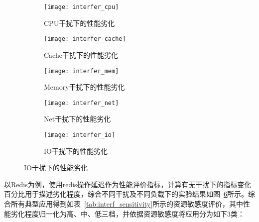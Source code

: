 \begin{figure}[H]
    \centering
    \begin{subfigure}[b]{0.32\textwidth}
        \texttt{[image: interfer\_cpu]}
        \caption{CPU干扰下的性能劣化}
        \label{fig:interfer_cpu}
    \end{subfigure}
    \begin{subfigure}[b]{0.32\textwidth}
      \texttt{[image: interfer\_cache]}
      \caption{Cache干扰下的性能劣化}
      \label{fig:interfer_cache}
    \end{subfigure}
    \begin{subfigure}[b]{0.32\textwidth}
        \texttt{[image: interfer\_mem]}
        \caption{Memory干扰下的性能劣化}
        \label{fig:interfer_mem}
    \end{subfigure}
    \begin{subfigure}[b]{0.32\textwidth}
        \texttt{[image: interfer\_net]}
        \caption{Net干扰下的性能劣化}
        \label{fig:interfer_net}
    \end{subfigure}
    \begin{subfigure}[b]{0.32\textwidth}
        \texttt{[image: interfer\_io]}
        \caption{IO干扰下的性能劣化}
        \label{fig:interfer_io}
    \end{subfigure}

\label{fig:redis_interf_sensitivity}
\end{figure}

以Redis为例，使用redis操作延迟作为性能评价指标，计算有无干扰下的指标变化百分比用于描述劣化程度，综合不同干扰及不同负载下的实验结果如图~\ref{fig:redis_interf_sensitivity}所示。综合所有典型应用得到如表~\ref{tab:interf_sensitivity}所示的资源敏感度评价，其中性能劣化程度归一化为高、中、低三档，并依据资源敏感度将应用分为如下3类：

